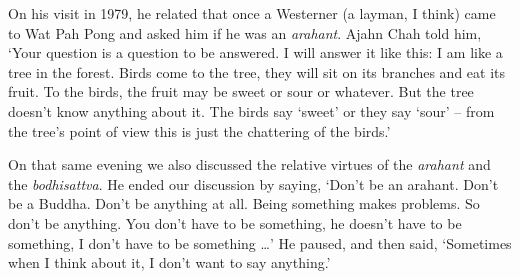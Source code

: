 On his visit in 1979, he related that once a Westerner (a layman, I
think) came to Wat Pah Pong and asked him if he was an \emph{arahant}.
Ajahn Chah told him, `Your question is a question to be answered. I will
answer it like this: I am like a tree in the forest. Birds come to the
tree, they will sit on its branches and eat its fruit. To the birds, the
fruit may be sweet or sour or whatever. But the tree doesn't know
anything about it. The birds say `sweet' or they say `sour' -- from the
tree's point of view this is just the chattering of the birds.'

On that same evening we also discussed the relative virtues of the
\emph{arahant} and the \emph{bodhisattva}. He ended our discussion by
saying, `Don't be an arahant. Don't be a Buddha. Don't be anything at
all. Being something makes problems. So don't be anything. You don't
have to be something, he doesn't have to be something, I don't have to
be something \ldots{}' He paused, and then said, `Sometimes when I think
about it, I don't want to say anything.'

